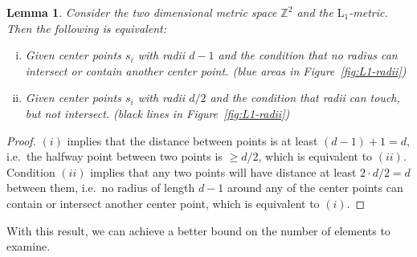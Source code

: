 \documentclass[a4paper,12pt,headsepline]{scrartcl}
\newtheorem{lemma}{Lemma}
\begin{document}
    
    \begin{lemma}

        Consider the two dimensional metric space $\mathbb{Z}^2$ and the $\operatorname{L_1}$-metric.
        Then the following is equivalent:

        \begin{enumerate}[(i)]
            \item Given center points $s_i$ with radii $d-1$ and the condition that no radius can intersect or contain another center point. (blue areas in Figure~\ref{fig:L1-radii})
            \item Given center points $s_i$ with radii $d/2$ and the condition that radii can touch, but not intersect. (black lines in Figure~\ref{fig:L1-radii})
        \end{enumerate}
        
        \label{lem:eq_radius}
    \end{lemma}
    \begin{proof}
        $(i)$ implies that the distance between points is at least $(d-1) + 1 = d$, i.e.\ the halfway point between two points is $\geq d/2$, which is equivalent to $(ii)$.
        Condition $(ii)$ implies that any two points will have distance at least $2 \cdot d/2 = d$ between them, i.e.\ no radius of length $d-1$ around any of the center points can contain or intersect another center point, which is equivalent to $(i)$. 
    \end{proof}

    With this result, we can achieve a better bound on the number of elements to examine.
\end{document}
